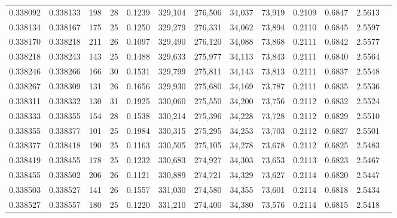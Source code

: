 \begin{tabular}{rrrrrrrrrrrrr}
0.338092 & 0.338133 &   198 &  28 &                                     0.1239 & 329,104 & 276,506 &  34,037 &  73,919 & 0.2109 & 0.6847 & 2.5613 \\
0.338134 & 0.338167 &   175 &  25 &                                     0.1250 & 329,279 & 276,331 &  34,062 &  73,894 & 0.2110 & 0.6845 & 2.5597 \\
0.338170 & 0.338218 &   211 &  26 &                                     0.1097 & 329,490 & 276,120 &  34,088 &  73,868 & 0.2111 & 0.6842 & 2.5577 \\
0.338218 & 0.338243 &   143 &  25 &                                     0.1488 & 329,633 & 275,977 &  34,113 &  73,843 & 0.2111 & 0.6840 & 2.5564 \\
0.338246 & 0.338266 &   166 &  30 &                                     0.1531 & 329,799 & 275,811 &  34,143 &  73,813 & 0.2111 & 0.6837 & 2.5548 \\
0.338267 & 0.338309 &   131 &  26 &                                     0.1656 & 329,930 & 275,680 &  34,169 &  73,787 & 0.2111 & 0.6835 & 2.5536 \\
0.338311 & 0.338332 &   130 &  31 &                                     0.1925 & 330,060 & 275,550 &  34,200 &  73,756 & 0.2112 & 0.6832 & 2.5524 \\
0.338333 & 0.338355 &   154 &  28 &                                     0.1538 & 330,214 & 275,396 &  34,228 &  73,728 & 0.2112 & 0.6829 & 2.5510 \\
0.338355 & 0.338377 &   101 &  25 &                                     0.1984 & 330,315 & 275,295 &  34,253 &  73,703 & 0.2112 & 0.6827 & 2.5501 \\
0.338377 & 0.338418 &   190 &  25 &                                     0.1163 & 330,505 & 275,105 &  34,278 &  73,678 & 0.2112 & 0.6825 & 2.5483 \\
0.338419 & 0.338455 &   178 &  25 &                                     0.1232 & 330,683 & 274,927 &  34,303 &  73,653 & 0.2113 & 0.6823 & 2.5467 \\
0.338455 & 0.338502 &   206 &  26 &                                     0.1121 & 330,889 & 274,721 &  34,329 &  73,627 & 0.2114 & 0.6820 & 2.5447 \\
0.338503 & 0.338527 &   141 &  26 &                                     0.1557 & 331,030 & 274,580 &  34,355 &  73,601 & 0.2114 & 0.6818 & 2.5434 \\
0.338527 & 0.338557 &   180 &  25 &                                     0.1220 & 331,210 & 274,400 &  34,380 &  73,576 & 0.2114 & 0.6815 & 2.5418 \\

\end{tabular}
